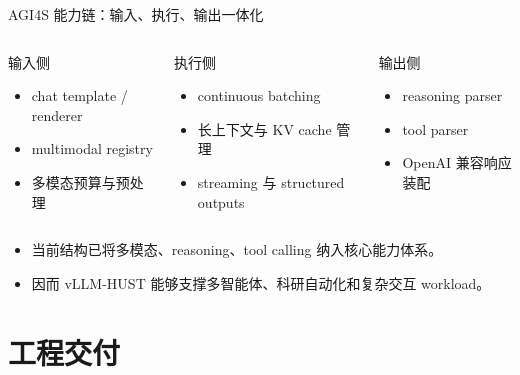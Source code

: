 \documentclass[aspectratio=169,11pt,fontset=none]{ctexbeamer}
\begin{document}
\begin{frame}{AGI4S 能力链：输入、执行、输出一体化}
  \begin{columns}[T]
    \begin{block}{输入侧}
      \begin{itemize}
        \item chat template / renderer
        \item multimodal registry
        \item 多模态预算与预处理
      \end{itemize}
    \end{block}

    \begin{block}{执行侧}
      \begin{itemize}
        \item continuous batching
        \item 长上下文与 KV cache 管理
        \item streaming 与 structured outputs
      \end{itemize}
    \end{block}

    \begin{block}{输出侧}
      \begin{itemize}
        \item reasoning parser
        \item tool parser
        \item OpenAI 兼容响应装配
      \end{itemize}
    \end{block}
  \end{columns}

  \vspace{0.7em}
  \begin{itemize}
    \item 当前结构已将多模态、reasoning、tool calling 纳入核心能力体系。
    \item 因而 vLLM-HUST 能够支撑多智能体、科研自动化和复杂交互 workload。
  \end{itemize}
\end{frame}

\section{工程交付}
\end{document}
